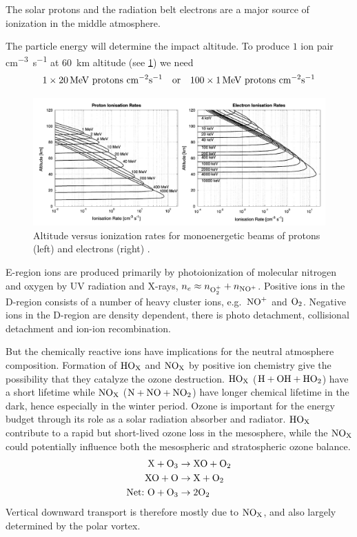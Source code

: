 The solar protons and the radiation belt electrons are a major source of ionization in the middle atmosphere.

The particle energy will determine the impact altitude. To produce \( 1 \) ion pair \si{\centi\metre^{-3}\second^{-1}} at \SI{60}{\kilo\metre} altitude (see \cref{fig:L6_impact_altitude}) we need
\begin{equation*}
    1\times\SI{20}{\mega\electronvolt}\tn{ protons } \si{\centi\metre^{-2}\second^{-1}}\quad\tn{or}\quad 100\times\SI{1}{\mega\electronvolt}\tn{ protons } \si{\centi\metre^{-2}\second^{-1}}
\end{equation*}
\begin{figure}[t]
    \centering
    \includegraphics[width=.8\linewidth]{bilder/L6_impact_altitude.png}
    \caption{Altitude versus ionization rates for monoenergetic beams of protons (left) and electrons (right) \citep{TurunenEsa2009Iode}.}\label{fig:L6_impact_altitude}
\end{figure}
E-region ions are produced primarily by photoionization of molecular nitrogen and oxygen by UV radiation and X-rays, \(n_e\approx n_{\tn{O}_2^+}+n_{\tn{NO}^+}\). Positive ions in the D-region consists of a number of heavy cluster ions, e.g.~\(\tn{NO}^+\) and \(\tn{O}_2\). Negative ions in the D-region are density dependent, there is photo detachment, collisional detachment and ion-ion recombination.

But the chemically reactive ions have implications for the neutral atmosphere composition. Formation of \(\tn{HO}_{\tn{X}}\) and \(\tn{NO}_{\tn{X}}\) by positive ion chemistry give the possibility that they catalyze the ozone destruction. \(\tn{HO}_{\tn{X}}\) (\(\tn{H}+\tn{OH}+\tn{HO}_2\)) have a short lifetime while \(\tn{NO}_{\tn{X}}\) (\(\tn{N}+\tn{NO}+\tn{NO}_2\)) have longer chemical lifetime in the dark, hence especially in the winter period. Ozone is important for the energy budget through its role as a solar radiation absorber and radiator. \(\tn{HO}_{\tn{X}}\) contribute to a rapid but short-lived ozone loss in the mesosphere, while the \(\tn{NO}_{\tn{X}}\) could potentially influence both the mesospheric and stratospheric ozone balance.
\begin{align*}
    \tn{X}+\tn{O}_3&\rightarrow \tn{XO}+\tn{O}_2\\
    \tn{XO}+\tn{O}&\rightarrow \tn{X}+\tn{O}_2\\
    \tn{Net:}~\tn{O}+\tn{O}_3&\rightarrow 2\tn{O}_2
\end{align*}
Vertical downward transport is therefore mostly due to \(\tn{NO}_{\tn{X}}\), and also largely determined by the polar vortex.

